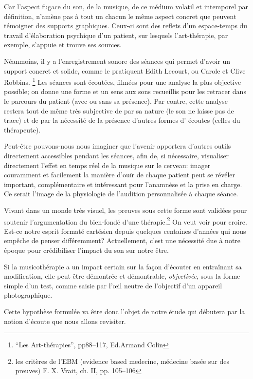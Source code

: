 Car l'aspect fugace du son, de la musique, de ce médium volatil et
intemporel par
définition, n'amène pas à tout un chacun le
même aspect concret que peuvent témoigner des supports
graphiques. Ceux-ci sont des 
reflets d'un espace-temps du travail d'élaboration
psychique d'un patient, sur lesquels l'art-thérapie, par exemple, s'appuie et trouve
ses sources.


Néanmoins, il y a l'enregistrement sonore des séances qui 
permet d'avoir un support concret et solide, comme le pratiquent Edith Lecourt, ou Carole et Clive 
Robbins. \footnote{``Les Art-thérapies'', pp88--117, Ed.Armand Colin}
Les séances sont écoutées, filmées pour une
analyse la plus objective possible; on donne 
une forme et un sens aux sons recueillis pour les retracer dans le
parcours du patient (avec ou sans sa présence). Par contre, cette analyse  restera
tout de même très subjective de par sa nature (le son ne laisse pas
de trace) et de par la nécessité de la présence d'autres formes d'
écoutes (celles du thérapeute).

Peut-être pouvons-nous nous imaginer que l'avenir apportera d'autres outils
directement accessibles pendant les séances, afin
 de, si nécessaire, visualiser directement l'effet en temps réel de la musique sur le
 cerveau:  imager couramment et facilement la manière d'ouïr de chaque
 patient peut se révéler important, complémentaire et intéressant pour l'anamnèse et la prise en charge.
 Ce serait l'image de la
 physiologie de l'audition personnalisée à chaque séance.

 
Vivant dans un monde très visuel, les preuves sous cette forme sont
validées pour soutenir l'argumentation du bien-fondé d'une thérapie.\footnote{
	les critères de l'EBM (evidence based medecine, médecine basée sur des 
        preuves) F. X. Vrait, ch. II, pp. 105--106 }
On veut voir pour croire. Est-ce 
notre esprit formaté cartésien depuis quelques centaines d'années qui nous 
empêche de penser différemment? 
Actuellement, c'est une nécessité due à notre époque pour crédibiliser l'impact 
du son sur notre être.


Si la 
musicothérapie a un impact certain sur la façon d'écouter en
entraînant sa 
modification, elle peut être  
démontrée et démontrable, \textsl{objectivée},
sous la forme simple d'un test, comme saisie par 
l'\oe il neutre de l'objectif d'un appareil
photographique.

Cette hypothèse formulée va être donc l'objet de notre étude qui
débutera par la notion d'écoute que nous allons revisiter.
